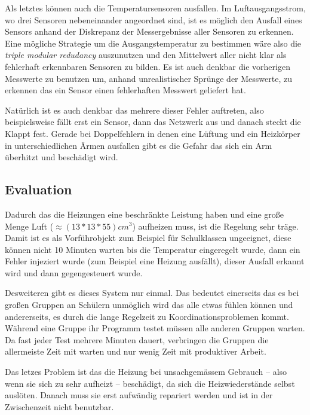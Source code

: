 Als letztes k{\"{o}}nnen auch die Temperatursensoren ausfallen. Im Luftausgangsstrom, wo drei Sensoren nebeneinander angeordnet sind, ist es m{\"{o}}glich den
Ausfall eines Sensors anhand der Diskrepanz der Messergebnisse aller Sensoren zu erkennen. Eine m{\"{o}}gliche Strategie um die Ausgangstemperatur zu
bestimmen w{\"{a}}re also die \textit{triple modular redudancy} auszunutzen und den Mittelwert aller nicht klar als fehlerhaft erkennbaren Sensoren zu bilden.
Es ist auch denkbar die vorherigen Messwerte zu benutzen um, anhand unrealistischer Spr{\"{u}}nge der Messwerte, zu erkennen das ein Sensor einen fehlerhaften
Messwert geliefert hat.

Nat{\"{u}}rlich ist es auch denkbar das mehrere dieser Fehler auftreten, also beispielsweise f{\"{a}}llt
erst ein Sensor, dann das Netzwerk aus und danach steckt die Klappt fest.
Gerade bei Doppelfehlern in denen eine L{\"{u}}ftung und ein Heizk{\"{o}}rper in unterschiedlichen {\"{A}}rmen 
ausfallen gibt es die Gefahr das sich ein Arm {\"{u}}berhitzt und besch{\"{a}}digt wird.

\subsection{Evaluation} Dadurch das die Heizungen eine beschr{\"{a}}nkte Leistung haben und eine gro{\ss}e Menge Luft ($ \approx (13*13*55)cm^3$) aufheizen muss,
ist die Regelung sehr tr{\"{a}}ge. Damit ist es als Vorf{\"{u}}hrobjekt zum Beispiel f{\"{u}}r Schulklassen ungeeignet, diese k{\"{o}}nnen nicht 10 Minuten warten
bis die Temperatur eingeregelt wurde, dann ein Fehler injeziert wurde (zum Beispiel eine Heizung ausf{\"{a}}llt), dieser Ausfall erkannt wird und dann gegengesteuert
wurde.

Desweiteren gibt es dieses System nur einmal. Das bedeutet einerseits das es bei gro{\ss}en Gruppen an Sch{\"{u}}lern unm{\"{o}}glich wird das alle etwas
f{\"{u}}hlen k{\"{o}}nnen und andererseits, es durch die lange Regelzeit zu Koordinationsproblemen kommt. W{\"{a}}hrend eine Gruppe ihr Programm testet m{\"{u}}ssen
alle anderen Gruppen warten. Da fast jeder Test mehrere Minuten dauert, verbringen die Gruppen die allermeiste Zeit mit warten und nur wenig Zeit mit produktiver
Arbeit.

Das letzes Problem ist das die Heizung bei unsachgem{\"{a}}ssem Gebrauch -- also wenn sie sich zu sehr aufheizt --
besch{\"{a}}digt, da sich die Heizwiederst{\"{a}}nde selbst ausl{\"{o}}ten. Danach muss sie erst aufw{\"{a}}ndig
repariert werden und ist in der Zwischenzeit nicht benutzbar.

